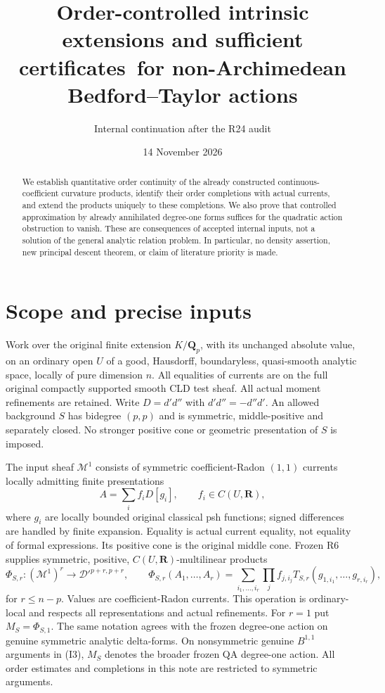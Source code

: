 \documentclass[11pt]{article}
\title{Order-controlled intrinsic extensions and sufficient certificates\ for non-Archimedean Bedford--Taylor actions}
\author{Internal continuation after the R24 audit}
\date{14 November 2026}
\theoremstyle{remark}\newtheorem{remark}[theorem]{Remark}
\newcommand{\M}{\mathcal M^1}
\begin{document}
\maketitle
\begin{abstract}
We establish quantitative order continuity of the already constructed
continuous-coefficient curvature products, identify their order completions
with actual currents, and extend the products uniquely to these completions.
We also prove that controlled approximation by already annihilated
degree-one forms suffices for the quadratic action obstruction to vanish.
These are consequences of accepted internal inputs, not a solution of the
general analytic relation problem. In particular, no density assertion,
new principal descent theorem, or claim of literature priority is made.
\end{abstract}
\tableofcontents

\section{Scope and precise inputs}

Work over the original finite extension $K/\mathbf Q_p$, with its unchanged
absolute value, on an ordinary open $U$ of a good, Hausdorff, boundaryless,
quasi-smooth analytic space, locally of pure dimension $n$. All equalities
of currents are on the full original compactly supported smooth CLD test
sheaf. All actual moment refinements are retained. Write $D=d'd''$ with
$d'd''=-d''d'$. An allowed background $S$ has bidegree $(p,p)$ and is
symmetric, middle-positive and separately closed. No stronger positive cone
or geometric presentation of $S$ is imposed.

The input sheaf $\M$ consists of symmetric coefficient-Radon $(1,1)$
currents locally admitting finite presentations
\[
 A=\sum_i f_iD[g_i],\qquad f_i\in C(U,\mathbf R),
\]
where $g_i$ are locally bounded original classical psh functions; signed
differences are handled by finite expansion. Equality is actual current
equality, not equality of formal expressions. Its positive cone is the
original middle cone. Frozen R6 supplies symmetric, positive,
$C(U,\mathbf R)$-multilinear products
\[
 \Phi_{S,r}:(\M)^r\longrightarrow\mathcal D'^{p+r,p+r},\qquad
 \Phi_{S,r}(A_1,\ldots,A_r)
 =\sum_{i_1,\ldots,i_r}\prod_j f_{j,i_j}
       T_{S,r}(g_{1,i_1},\ldots,g_{r,i_r}),
 \tag{I1}
\]
for $r\le n-p$. Values are coefficient-Radon currents. This operation is
ordinary-local and respects all representations and actual refinements.
For $r=1$ put $M_S=\Phi_{S,1}$. The same notation agrees with the frozen
degree-one action on genuine symmetric analytic delta-forms. On
nonsymmetric genuine $B^{1,1}$ arguments in (I3), $M_S$ denotes the
broader frozen QA degree-one action. All order estimates and completions
in this note are restricted to symmetric arguments.
\end{document}
